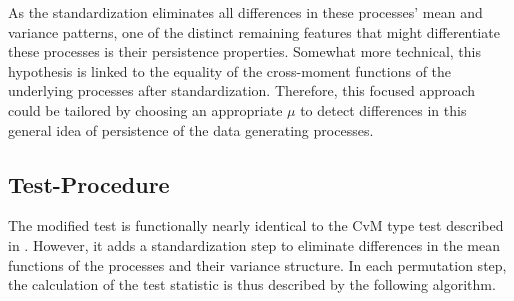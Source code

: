 \documentclass[12pt, a4paper]{article}
\theoremstyle{MAstyle} \newtheorem{assumption}{Assumption}[section]
\theoremstyle{MAstyle} \newtheorem{definition}{Definition}[section]
\theoremstyle{MAstyle} \newtheorem{theorem}{Theorem}[section]
\begin{document}
		As the standardization eliminates all differences in these processes' mean and variance patterns, one of the distinct remaining features that might differentiate these processes is their persistence properties.
		Somewhat more technical, this hypothesis is linked to the equality of the cross-moment functions of the underlying processes after standardization.
		Therefore, this focused approach could be tailored by choosing an appropriate $\mu$ to detect differences in this general idea of persistence of the data generating processes. 
		
		\newpage
		\subsection{Test-Procedure}\label{persistence_test}
		The modified test is functionally nearly identical to the CvM type test described in \cite{bugni_permutation_2021}. However, it adds a standardization step to eliminate differences in the mean functions of the processes and their variance structure. In each permutation step, the calculation of the test statistic is thus described by the following algorithm.
		
\end{document}
